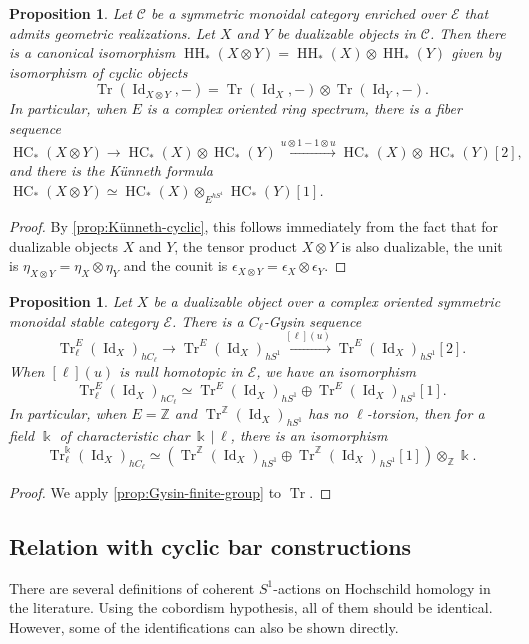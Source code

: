\documentclass[11pt]{amsart}
\numberwithin{equation}{section}
\theoremstyle{plain}
\newtheorem{Prop}[prop]{Proposition}
\theoremstyle{definition}
\theoremstyle{remark}
\newcommand{\bZ} { {\mathbb{Z}}}
\newcommand{\cC} { {\mathcal{C}}}
\newcommand{\cE} { {\mathcal{E}}}
\newcommand{\Id}{{\operatorname{Id}}}
\newcommand\HH{\operatorname{HH}}
\newcommand\Tr{\operatorname{Tr}}
\newcommand\HC{ {\operatorname{HC} } }
\begin{document}
\begin{Prop}\label{cor:Künneth}
    Let $\cC$ be a symmetric monoidal category enriched over $\cE$ that admits geometric realizations. Let $X$ and $Y$ be dualizable objects in $\cC$. Then there is a canonical isomorphism $\HH_*(X \otimes Y) = \HH_*(X) \otimes \HH_*(Y)$ given by isomorphism of cyclic objects
    \[\Tr(\Id_{X \otimes Y}, -) = \Tr(\Id_X, -) \otimes \Tr(\Id_Y, -).\]
    In particular, when $E$ is a complex oriented ring spectrum, there is a fiber sequence
    \[\HC_*(X \otimes Y) \to \HC_*(X) \otimes \HC_*(Y) \xrightarrow{u \otimes 1 - 1 \otimes u} \HC_*(X) \otimes \HC_*(Y)[2],\]
    and there is the K\"unneth formula $\HC_*(X \otimes Y) \simeq \HC_*(X) \otimes_{E^{hS^1}} \HC_*(Y)[1]$.
\end{Prop}
\begin{proof}
By \autoref{prop:Künneth-cyclic}, this follows immediately from the fact that for dualizable objects $X$ and $Y$, the tensor product $X \otimes Y$ is also dualizable, the unit is $\eta_{X \otimes Y} = \eta_X \otimes \eta_Y$ and the counit is $\epsilon_{X \otimes Y} = \epsilon_X \otimes \epsilon_Y$. 
\end{proof}


\begin{Prop}
    Let $X$ be a dualizable object over a complex oriented symmetric monoidal stable category $\cE$. There is a $C_\ell$-Gysin sequence
    \[\Tr_\ell^E(\Id_X)_{hC_\ell} \to \Tr^E(\Id_X)_{hS^1} \xrightarrow{[\ell] (u)} \Tr^E(\Id_X)_{hS^1}[2].\]
    When $[\ell](u)$ is null homotopic in $\cE$, we have an isomorphism
    \[ \Tr_\ell^E(\Id_X)_{hC_\ell} \simeq \Tr^E(\Id_X)_{hS^1} \oplus \Tr^E(\Id_X)_{hS^1}[1].\]
    In particular, when $E = \bZ$ and $\Tr^\bZ(\Id_X)_{hS^1}$ has no $\ell$-torsion, then for a field $\Bbbk$ of characteristic $char\,\Bbbk\,|\,\ell$, there is an isomorphism
    \[ \Tr_\ell^\Bbbk(\Id_X)_{hC_\ell} \simeq (\Tr^\bZ(\Id_X)_{hS^1} \oplus \Tr^\bZ(\Id_X)_{hS^1}[1] ) \otimes_\bZ \Bbbk.\]
\end{Prop}

\begin{proof}We apply \autoref{prop:Gysin-finite-group} to $\Tr$.
\end{proof}




\subsection{Relation with cyclic bar constructions}
There are several definitions of coherent $S^1$-actions on Hochschild homology in the literature. Using the cobordism hypothesis, all of them should be identical. However, some of the identifications can also be shown directly. 
\end{document}
